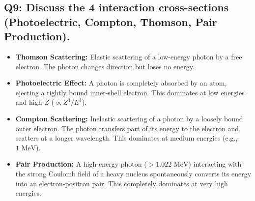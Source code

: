\documentclass[a4paper,11pt]{article}
\begin{document}
\subsection*{Q9: Discuss the 4 interaction cross-sections (Photoelectric, Compton, Thomson, Pair Production).}
\begin{itemize}
    \item \textbf{Thomson Scattering:} Elastic scattering of a low-energy photon by a free electron. The photon changes direction but loses no energy.
    \item \textbf{Photoelectric Effect:} A photon is completely absorbed by an atom, ejecting a tightly bound inner-shell electron. This dominates at low energies and high $Z$ ($\propto Z^4/E^3$).
    \item \textbf{Compton Scattering:} Inelastic scattering of a photon by a loosely bound outer electron. The photon transfers part of its energy to the electron and scatters at a longer wavelength. This dominates at medium energies (e.g., $1\text{ MeV}$).
    \item \textbf{Pair Production:} A high-energy photon ($>1.022\text{ MeV}$) interacting with the strong Coulomb field of a heavy nucleus spontaneously converts its energy into an electron-positron pair. This completely dominates at very high energies.
\end{itemize}
\end{document}

